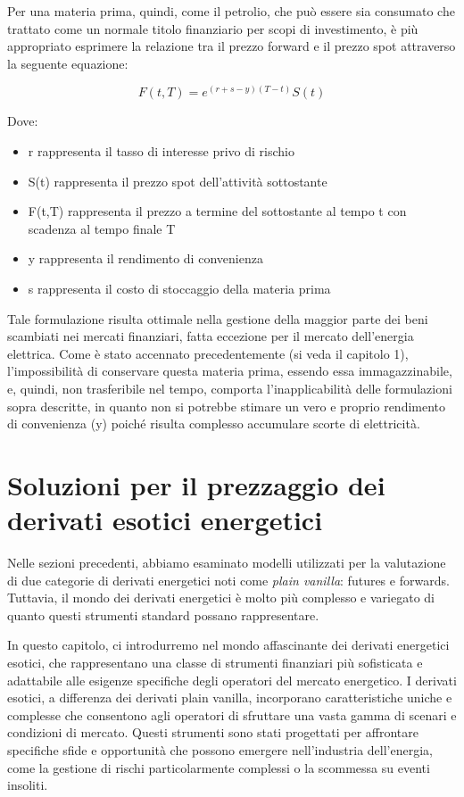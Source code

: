 \documentclass[12pt,a4paper]{report}
\begin{document}
Per una materia prima, quindi, come il petrolio, che può essere sia consumato che trattato come un normale titolo finanziario per scopi di investimento, è più appropriato esprimere la relazione tra il prezzo forward e il prezzo spot attraverso la seguente equazione:

\begin{equation}
    F(t,T) = e^{(r+s-y)(T-t)} S(t)
\end{equation}

Dove:

\begin{itemize}
    \item r rappresenta il tasso di interesse privo di rischio
    \item S(t) rappresenta il prezzo spot dell'attività sottostante
    \item F(t,T) rappresenta il prezzo a termine del sottostante al tempo t con scadenza al tempo finale T
    \item y rappresenta il rendimento di convenienza
    \item s rappresenta il costo di stoccaggio della materia prima
\end{itemize}

Tale formulazione risulta ottimale nella gestione della maggior parte dei beni scambiati nei mercati finanziari, fatta eccezione per il mercato dell'energia elettrica. Come è stato accennato precedentemente (si veda il capitolo 1), l'impossibilità di conservare questa materia prima, essendo essa immagazzinabile, e, quindi, non trasferibile nel tempo, comporta l'inapplicabilità delle formulazioni sopra descritte, in quanto non si potrebbe stimare un vero e proprio rendimento di convenienza (y) poiché risulta complesso accumulare scorte di elettricità. 



\chapter{Soluzioni per il prezzaggio dei derivati esotici energetici}

Nelle sezioni precedenti, abbiamo esaminato modelli utilizzati per la valutazione di due categorie di derivati energetici noti come \textit{plain vanilla}: futures e forwards. Tuttavia, il mondo dei derivati energetici è molto più complesso e variegato di quanto questi strumenti standard possano rappresentare. 

In questo capitolo, ci introdurremo nel mondo affascinante dei derivati energetici esotici, che rappresentano una classe di strumenti finanziari più sofisticata e adattabile alle esigenze specifiche degli operatori del mercato energetico.
I derivati esotici, a differenza dei derivati plain vanilla, incorporano caratteristiche uniche e complesse che consentono agli operatori di sfruttare una vasta gamma di scenari e condizioni di mercato. Questi strumenti sono stati progettati per affrontare specifiche sfide e opportunità che possono emergere nell'industria dell'energia, come la gestione di rischi particolarmente complessi o la scommessa su eventi insoliti.
\end{document}
